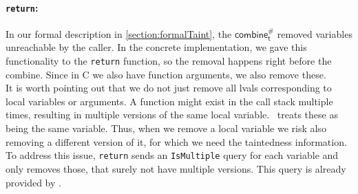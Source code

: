         \paragraph{\texttt{return}:} In our formal description in \autoref{section:formalTaint}, the $\textsf{combine}^{\#}_\textsf{t}$ removed variables unreachable by the caller. In the concrete implementation, we gave this functionality to the \texttt{return} function, so the removal happens right before the combine. Since in C we also have function arguments, we also remove these.\\
        It is worth pointing out that we do not just remove all \ac{lval}s corresponding to local variables or arguments. A function might exist in the call stack multiple times, resulting in multiple versions of the same local variable. \gob\ treats these as being the same variable. Thus, when we remove a local variable we risk also removing a different version of it, for which we need the taintedness information. To address this issue, \texttt{return} sends an \texttt{IsMultiple} query for each variable and only removes those, that surely not have multiple versions. This query is already provided by \gob.

